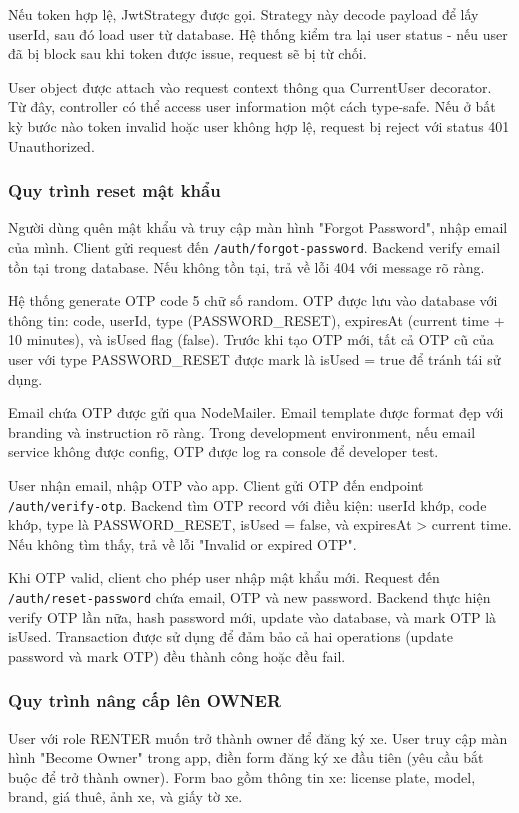 Nếu token hợp lệ, JwtStrategy được gọi. Strategy này decode payload để lấy userId, sau đó load user từ database. Hệ thống kiểm tra lại user status - nếu user đã bị block sau khi token được issue, request sẽ bị từ chối.

User object được attach vào request context thông qua CurrentUser decorator. Từ đây, controller có thể access user information một cách type-safe. Nếu ở bất kỳ bước nào token invalid hoặc user không hợp lệ, request bị reject với status 401 Unauthorized.

\subsubsection{Quy trình reset mật khẩu}
Người dùng quên mật khẩu và truy cập màn hình "Forgot Password", nhập email của mình. Client gửi request đến \texttt{/auth/forgot-password}. Backend verify email tồn tại trong database. Nếu không tồn tại, trả về lỗi 404 với message rõ ràng.

Hệ thống generate OTP code 5 chữ số random. OTP được lưu vào database với thông tin: code, userId, type (PASSWORD\_RESET), expiresAt (current time + 10 minutes), và isUsed flag (false). Trước khi tạo OTP mới, tất cả OTP cũ của user với type PASSWORD\_RESET được mark là isUsed = true để tránh tái sử dụng.

Email chứa OTP được gửi qua NodeMailer. Email template được format đẹp với branding và instruction rõ ràng. Trong development environment, nếu email service không được config, OTP được log ra console để developer test.

User nhận email, nhập OTP vào app. Client gửi OTP đến endpoint \texttt{/auth/verify-otp}. Backend tìm OTP record với điều kiện: userId khớp, code khớp, type là PASSWORD\_RESET, isUsed = false, và expiresAt > current time. Nếu không tìm thấy, trả về lỗi "Invalid or expired OTP".

Khi OTP valid, client cho phép user nhập mật khẩu mới. Request đến \texttt{/auth/reset-password} chứa email, OTP và new password. Backend thực hiện verify OTP lần nữa, hash password mới, update vào database, và mark OTP là isUsed. Transaction được sử dụng để đảm bảo cả hai operations (update password và mark OTP) đều thành công hoặc đều fail.

\subsubsection{Quy trình nâng cấp lên OWNER}
User với role RENTER muốn trở thành owner để đăng ký xe. User truy cập màn hình "Become Owner" trong app, điền form đăng ký xe đầu tiên (yêu cầu bắt buộc để trở thành owner). Form bao gồm thông tin xe: license plate, model, brand, giá thuê, ảnh xe, và giấy tờ xe.

